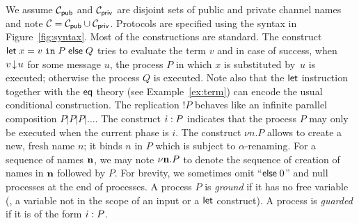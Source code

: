 We assume $\mathcal{C}_{\mathsf{pub}}$ and $\mathcal{C}_{\mathsf{priv}}$ are disjoint sets of public and private channel
names and note $\mathcal{C}=\mathcal{C}_{\mathsf{pub}}\cup\mathcal{C}_{\mathsf{priv}}$. %
Protocols are specified using the syntax
in Figure~\ref{fig:syntax}.
%
%
Most of the constructions are standard.
The construct  $\mathsf{let} \; x = v \;\mathtt{in} \;P \; \mathsf{else} \; Q$
tries to evaluate the term $v$ and in case of success, 
\ie when $v \!\downarrow\! u$ for some message $u$, the process $P$ 
in which $x$ is substituted by~$u$ is executed;
otherwise the process $Q$ is executed.
Note also that the $\mathsf{let}$ instruction together with the
$\mathsf{eq}$ theory (see Example~\ref{ex:term}) can encode the usual
conditional construction.
The replication $!P$ behaves like an infinite parallel composition
$P|P|P|\ldots$.
The construct $i: P$ indicates that the process
$P$ may only be executed when the current phase is $i$.
%
%
The construct $\nu n.P$ allows to create a new, fresh name $n$;
it binds $n$ in $P$ which is subject to $\alpha$-renaming.
For a sequence of names ${\mathbf{n}}$, we may note $\nu{\mathbf{n}}.P$
to denote the sequence of creation of names in ${\mathbf{n}}$ followed by $P$.
For brevity, we sometimes omit ``$\mathsf{else}\;0$''
and null processes at the end of processes.
A process $P$ is {\em ground} if it has no free variable 
(\ie, a variable not in the scope of an input or a $\mathsf{let}$ construct).
A process is {\em guarded} if it is of the form $i: P$.


